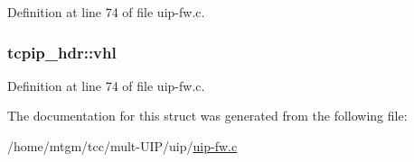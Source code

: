 Definition at line 74 of file uip-\/fw.c.

\hypertarget{structtcpip__hdr_a24ef3e6d22964f5770a7a6afb1a5b5e5}{
\subsubsection[{vhl}]{ {\bf tcpip\_\-hdr::vhl}}}
\label{structtcpip__hdr_a24ef3e6d22964f5770a7a6afb1a5b5e5}


Definition at line 74 of file uip-\/fw.c.



The documentation for this struct was generated from the following file:\begin{DoxyCompactItemize}
\item 
/home/mtgm/tcc/mult-\/UIP/uip/\hyperlink{uip-fw_8c}{uip-\/fw.c}\end{DoxyCompactItemize}
